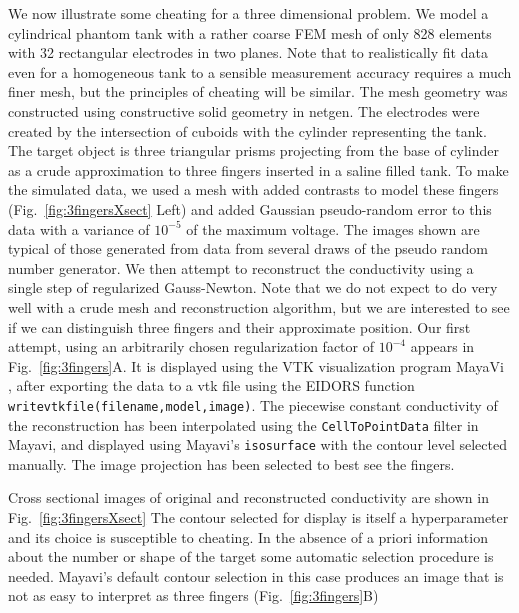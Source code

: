 \documentclass[12pt]{iopart}
\begin{document}
We now illustrate some cheating for a three dimensional
problem. We model a cylindrical phantom tank with a rather
coarse FEM mesh of only 828 elements with 32 rectangular
electrodes in two planes. Note that to realistically
fit data even for a homogeneous tank to a sensible
measurement accuracy requires a much finer mesh, but the
principles of cheating will be similar. The mesh geometry
was constructed using constructive solid geometry in
netgen. The electrodes were created by the intersection
of cuboids with the cylinder representing the tank. The
target object is three triangular prisms projecting from
the base of cylinder as a crude approximation to three
fingers inserted in a saline filled tank. To make the
simulated data, we used a mesh with added contrasts to model
these fingers (Fig.~\ref{fig:3fingersXsect} Left) and added Gaussian pseudo-random
error to this data with a variance of $10^{-5}$ of the maximum
voltage. The images shown are typical of those generated
from data from several draws of the pseudo random number
generator. We then attempt to reconstruct the conductivity
using a single step of regularized Gauss-Newton. Note that we do not expect to do
very well with a crude mesh and reconstruction algorithm,
but we are interested to see if we can distinguish three
fingers and their approximate position. Our first attempt,
using an arbitrarily chosen regularization factor
of $10^{-4}$ appears in Fig.~\ref{fig:3fingers}A. It is
displayed using the VTK visualization program MayaVi
\cite{Ramachandran_2003}, after exporting the data to a vtk file
using the EIDORS function {\tt writevtkfile(filename,model,image)}. The
piecewise constant conductivity of the reconstruction has
been interpolated using the {\tt CellToPointData} filter in
Mayavi, and displayed using Mayavi's {\tt isosurface} with
the contour level selected manually. The image projection
has been selected to best see the fingers.


Cross sectional images of original and reconstructed
conductivity are shown in Fig.~\ref{fig:3fingersXsect}
The contour selected for display is itself a
hyperparameter and its choice is susceptible to
cheating. In the absence of a priori information about
the number or shape of the target some automatic selection
procedure is needed. Mayavi's default contour selection
in this case produces an image that is not as easy to
interpret as three fingers (Fig.~\ref{fig:3fingers}B)
\end{document}
